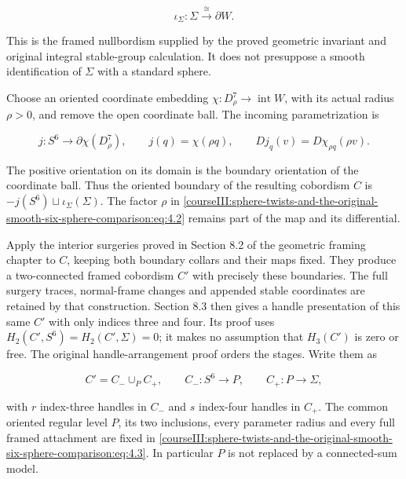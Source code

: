\begin{equation}
\iota_\Sigma:\Sigma\xrightarrow{\cong}\partial W .
 \label{courseIII:sphere-twists-and-the-original-smooth-six-sphere-comparison:eq:4.1}
\end{equation}

This is the framed nullbordism supplied by the proved geometric invariant and original integral stable-group calculation. It does not presuppose a smooth identification of \(\Sigma\) with a standard sphere.

Choose an oriented coordinate embedding \(\chi:D^7_\rho\to\operatorname{int}W\), with its actual radius \(\rho>0\), and remove the open coordinate ball. The incoming parametrization is

\begin{equation}
j:S^6\longrightarrow\partial\chi(D^7_\rho),\qquad
                 j(q)=\chi(\rho q),\qquad Dj_q(v)=D\chi_{\rho q}(\rho v).
 \label{courseIII:sphere-twists-and-the-original-smooth-six-sphere-comparison:eq:4.2}
\end{equation}

The positive orientation on its domain is the boundary orientation of the coordinate ball. Thus the oriented boundary of the resulting cobordism \(C\) is \(-j(S^6)\sqcup\iota_\Sigma(\Sigma)\). The factor \(\rho\) in \eqref{courseIII:sphere-twists-and-the-original-smooth-six-sphere-comparison:eq:4.2} remains part of the map and its differential.

Apply the interior surgeries proved in Section 8.2 of the geometric framing chapter to \(C\), keeping both boundary collars and their maps fixed. They produce a two-connected framed cobordism \(C'\) with precisely these boundaries. The full surgery traces, normal-frame changes and appended stable coordinates are retained by that construction. Section 8.3 then gives a handle presentation of this same \(C'\) with only indices three and four. Its proof uses \(H_2(C',S^6)=H_2(C',\Sigma)=0\); it makes no assumption that \(H_3(C')\) is zero or free. The original handle-arrangement proof orders the stages. Write them as

\begin{equation}
C'=C_-\cup_P C_+,\qquad
 C_-:S^6\longrightarrow P,\qquad C_+:P\longrightarrow\Sigma,
 \label{courseIII:sphere-twists-and-the-original-smooth-six-sphere-comparison:eq:4.3}
\end{equation}

with \(r\) index-three handles in \(C_-\) and \(s\) index-four handles in \(C_+\). The common oriented regular level \(P\), its two inclusions, every parameter radius and every full framed attachment are fixed in \eqref{courseIII:sphere-twists-and-the-original-smooth-six-sphere-comparison:eq:4.3}. In particular \(P\) is not replaced by a connected-sum model.


